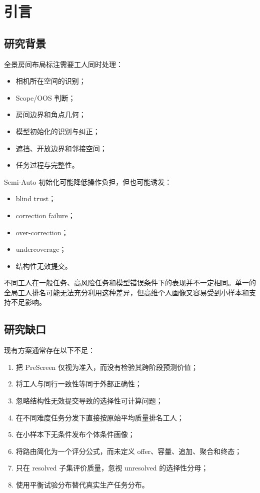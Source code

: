 \section{引言}

\subsection{研究背景}

全景房间布局标注需要工人同时处理：

\begin{itemize}
  \item 相机所在空间的识别；
  \item Scope/OOS 判断；
  \item 房间边界和角点几何；
  \item 模型初始化的识别与纠正；
  \item 遮挡、开放边界和邻接空间；
  \item 任务过程与完整性。
\end{itemize}

Semi-Auto 初始化可能降低操作负担，但也可能诱发：

\begin{itemize}
  \item blind trust；
  \item correction failure；
  \item over-correction；
  \item undercoverage；
  \item 结构性无效提交。
\end{itemize}

不同工人在一般任务、高风险任务和模型错误条件下的表现并不一定相同。单一的全局工人排名可能无法充分利用这种差异，但高维个人画像又容易受到小样本和支持不足影响。

\subsection{研究缺口}

现有方案通常存在以下不足：

\begin{enumerate}
  \item 把 PreScreen 仅视为准入，而没有检验其跨阶段预测价值；
  \item 将工人与同行一致性等同于外部正确性；
  \item 忽略结构性无效提交导致的选择性可计算问题；
  \item 在不同难度任务分发下直接按原始平均质量排名工人；
  \item 在小样本下无条件发布个体条件画像；
  \item 将路由简化为一个评分公式，而未定义 offer、容量、追加、聚合和终态；
  \item 只在 resolved 子集评价质量，忽视 unresolved 的选择性分母；
  \item 使用平衡试验分布替代真实生产任务分布。
\end{enumerate}

